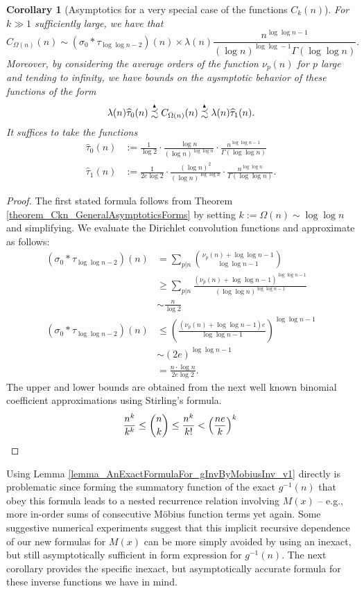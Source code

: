 \documentclass[11pt,reqno,a4letter]{article}
\numberwithin{figure}{section}
\numberwithin{table}{section}
\theoremstyle{plain}
\newtheorem{cor}[theorem]{Corollary}
\numberwithin{theorem}{section}
\theoremstyle{definition}
\newcommand{\PrecSim}[0]{\overset{_{\scriptsize{\blacktriangle}}}{\precsim}}
\begin{document}
\begin{cor}[Asymptotics for a very special case of the functions $C_k(n)$] 
\label{cor_Asymptotics_KeyCases_Of_Ckn_v1} 
For $k \gg 1$ sufficiently large, we have that 
\[
C_{\Omega(n)}(n) \sim (\sigma_0 \ast \tau_{\log\log n-2})(n) \times \lambda(n) 
     \frac{n^{\log\log n -1}}{(\log n)^{\log\log -1} \Gamma(\log\log n)}. 
\]
Moreover, by considering the average orders of the function $\nu_p(n)$ for $p$ large and 
tending to infinity, we have bounds on the aysmptotic behavior of these functions 
of the form 
\[
\lambda(n)\widehat{\tau}_0(n) \PrecSim C_{\Omega(n)}(n) \PrecSim \lambda(n)\widehat{\tau}_1(n). 
\]
It suffices to take the functions 
\begin{align*} 
\widehat{\tau}_0(n) & := \frac{1}{\log 2} \cdot \frac{\log n}{(\log n)^{\log\log n}} \cdot 
     \frac{n^{\log\log n-1}}{\Gamma(\log\log n)} \\ 
\widehat{\tau}_1(n) & := \frac{1}{2e \log 2} \cdot \frac{(\log n)^2}{(\log n)^{\log\log n}} \cdot 
     \frac{n^{\log\log n}}{\Gamma(\log\log n)}. 
\end{align*} 
\end{cor} 
\begin{proof} 
The first stated formula follows from 
Theorem \ref{theorem_Ckn_GeneralAsymptoticsForms} by setting 
$k := \Omega(n) \sim \log\log n$ and simplifying. We evaluate the Dirichlet convolution 
functions and approximate as follows: 
\begin{align*} 
(\sigma_0 \ast \tau_{\log\log n-2})(n) & = \sum_{p|n} \binom{\nu_p(n) + \log\log n-1}{\log\log n-1} \\ 
     & \geq \sum_{p|n} \frac{(\nu_p(n) + \log\log n-1)^{\log\log n-1}}{(\log\log n)^{\log\log n-1}} \\ 
     & \sim \frac{n}{\log 2} \\ 
(\sigma_0 \ast \tau_{\log\log n-2})(n) & \leq \left(
     \frac{(\nu_p(n) + \log\log n-1)e}{\log\log n-1} 
     \right)^{\log\log n -1} \\ 
     & \sim (2e)^{\log\log n-1} \\ 
     & = \frac{n \cdot \log n}{2e \log 2}.    
\end{align*} 
The upper and lower bounds are obtained from the next well known binomial coefficient approximations 
using Stirling's formula. 
\[
\frac{n^k}{k^k} \leq \binom{n}{k} \leq \frac{n^k}{k!} < \left(\frac{ne}{k}\right)^k 
     \qedhere 
\]
\end{proof} 

Using Lemma \ref{lemma_AnExactFormulaFor_gInvByMobiusInv_v1} directly is problematic since 
forming the summatory function of the exact $g^{-1}(n)$ that obey this formula leads to 
a nested recurrence relation involving $M(x)$ -- e.g., 
more in-order sums of consecutive M\"obius function terms yet again. 
Some suggestive numerical experiments suggest that this implicit recursive 
dependence of our new formulas for $M(x)$ can be more simply avoided by using an inexact, but still 
asymptotically sufficient in form expression for $g^{-1}(n)$. 
The next corollary provides the specific 
inexact, but asymptotically accurate formula for these inverse functions we have in mind. 
\end{document}

